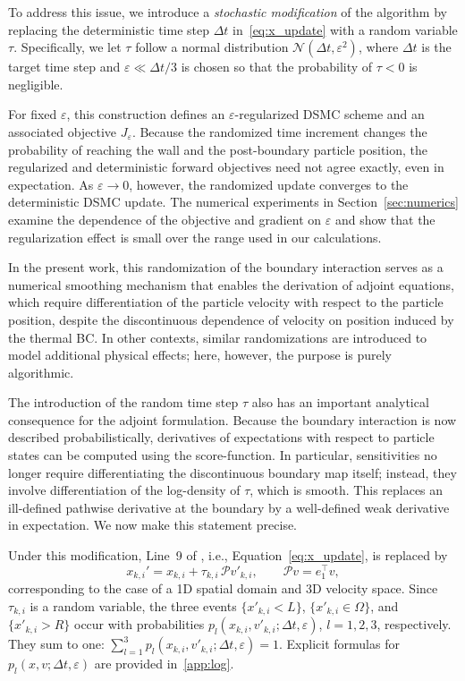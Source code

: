 \documentclass[12pt,nopreprintline]{elsarticle}
\begin{document}
To address this issue, we introduce a \emph{stochastic modification} of the algorithm by replacing the deterministic time step $\Delta t$ in~\eqref{eq:x_update} with a random variable $\tau$. Specifically, we let $\tau$ follow a normal distribution $\mathcal{N}(\Delta t, \varepsilon^2)$, where $\Delta t$ is the target time step and $\varepsilon \ll \Delta t/3$ is chosen so that the probability of $\tau < 0$ is negligible.

For fixed $\varepsilon$, this construction defines an $\varepsilon$-regularized DSMC scheme and an associated objective $J_\varepsilon$. Because the randomized time increment changes the probability of reaching the wall and the post-boundary particle position, the regularized and deterministic forward objectives need not agree exactly, even in expectation. As $\varepsilon\to0$, however, the randomized update converges to the deterministic DSMC update. The numerical experiments in Section~\ref{sec:numerics} examine the dependence of the objective and gradient on $\varepsilon$ and show that the regularization effect is small over the range used in our calculations.

In the present work, this randomization of the boundary interaction serves as a numerical smoothing mechanism that enables the derivation of adjoint equations, which require differentiation of the particle velocity with respect to the particle position, despite the discontinuous dependence of velocity on position induced by the thermal BC. In other contexts, similar randomizations are introduced to model additional physical effects; here, however, the purpose is purely algorithmic.

The introduction of the random time step $\tau$ also has an important analytical consequence for the adjoint formulation. Because the boundary interaction is now described probabilistically, derivatives of expectations with respect to particle states can be computed using the score-function. In particular, sensitivities no longer require differentiating the discontinuous boundary map itself; instead, they involve differentiation of the log-density of $\tau$, which is smooth. This replaces an ill-defined pathwise derivative at the boundary by a well-defined weak derivative in expectation. We now make this statement precise.

Under this modification, Line~9 of , i.e., Equation~\eqref{eq:x_update}, is replaced by
\begin{equation}
\label{eq:x_update_new}
x_{k,i}' = x_{k,i} + \tau_{k,i}\, \mathcal P v'_{k,i}, \qquad \mathcal P v = e_1^\top v,
\end{equation}
corresponding to the case of a 1D spatial domain and 3D velocity space. Since $\tau_{k,i}$ is a random variable, the three events $\{x'_{k,i} < L\}$, $\{x'_{k,i} \in \Omega\}$, and $\{x'_{k,i} > R\}$ occur with probabilities $p_l(x_{k,i}, v'_{k,i}; \Delta t, \varepsilon)$, $l=1,2,3$, respectively. They sum to one: $\sum_{l=1}^3 p_l(x_{k,i}, v'_{k,i}; \Delta t, \varepsilon) = 1$. Explicit formulas for $p_l(x,v;\Delta t,\varepsilon)$ are provided in~\ref{app:log}.
\end{document}
